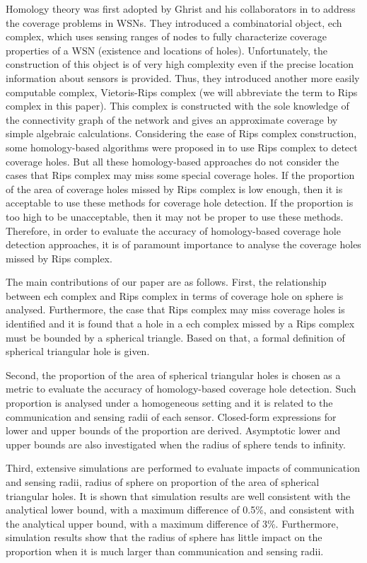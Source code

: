 \documentclass[journal, twoside]{IEEEtran}
\begin{document}
Homology theory was first adopted by Ghrist and his collaborators in \cite{DSG05, DSG07, GM05}
to address the coverage problems in WSNs. They introduced a combinatorial object,
ech complex, which uses sensing ranges of nodes to fully characterize coverage properties of a WSN (existence and locations of holes).
Unfortunately, the construction of this object is of very high 
complexity \cite{CO08} even if
the precise location information about sensors is provided. 
Thus, they introduced another more easily computable complex,
Vietoris-Rips complex (we will abbreviate the term to Rips complex in this paper). 
This complex is constructed with the sole
knowledge of the connectivity graph of the network and gives an
approximate coverage by simple algebraic calculations. 
Considering the ease of Rips complex construction, some homology-based 
algorithms were proposed in \cite{ME06, MJ07, TJ10} 
to use Rips complex to detect coverage holes. But all these homology-based
approaches do not consider the cases that
Rips complex may miss some special coverage holes. If the proportion
of the area of coverage holes missed by Rips complex is low enough,
then it is acceptable to use these methods for coverage hole detection.
If the proportion is too high to be unacceptable, then it may not be proper
to use these methods. Therefore, in order to evaluate the accuracy of homology-based 
coverage hole detection approaches, it is of paramount importance to 
analyse the coverage holes missed by Rips complex.

The main contributions of our paper are as follows. First, the relationship between
ech complex and Rips complex in terms of coverage
hole on sphere is analysed. Furthermore, the case that Rips complex
may miss coverage holes is identified and it is found that a hole in
a ech complex missed by a Rips complex must be 
bounded by a spherical triangle. Based on that, a formal definition
of spherical triangular hole is given.

Second, the proportion of the area of spherical triangular holes is chosen
as a metric to evaluate the accuracy of homology-based coverage hole 
detection. Such proportion is analysed under a homogeneous setting and it
is related to the communication and sensing radii of each sensor. 
Closed-form expressions for lower and upper bounds of the proportion 
are derived. Asymptotic lower and upper bounds are also investigated
when the radius of sphere tends to infinity.

Third, extensive simulations are performed to evaluate impacts of
communication and sensing radii, radius of sphere on proportion
of the area of spherical triangular holes. It is shown that simulation 
results are well consistent with the analytical lower bound, with a maximum 
difference of 0.5\%, and consistent with the analytical upper bound, with
a maximum difference of 3\%. Furthermore, simulation results
show that the radius of sphere has little impact on the proportion when
it is much larger than communication and sensing radii.   
\end{document}
